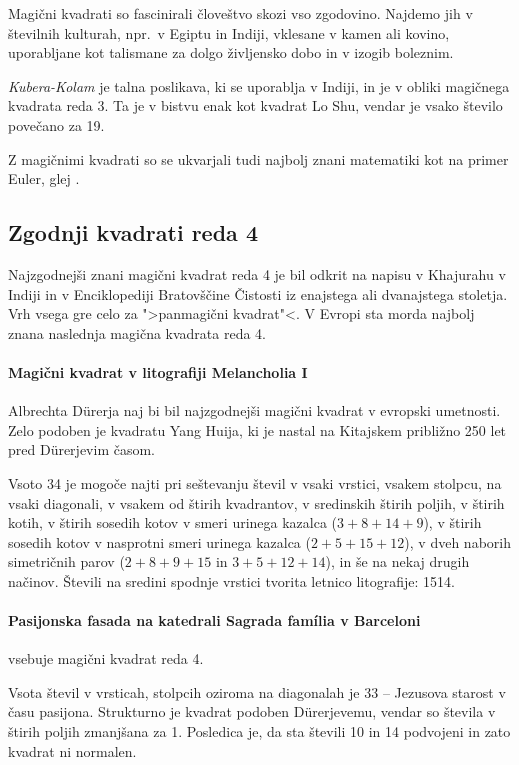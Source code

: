 \documentclass[a4paper,12pt]{article}
\theoremstyle{definition}
\theoremstyle{plain}
\begin{document}
Magični kvadrati so fascinirali človeštvo skozi vso zgodovino. Najdemo jih
v številnih kulturah, npr.\ v Egiptu in Indiji, vklesane v kamen ali
kovino, uporabljane kot talismane za dolgo življensko dobo in v
izogib boleznim.

\emph{Kubera-Kolam} je talna poslikava, ki se uporablja v Indiji, in je v
obliki magičnega kvadrata reda 3. Ta je v bistvu enak kot kvadrat
Lo Shu, vendar je vsako število povečano za 19.

Z magičnimi kvadrati so se ukvarjali tudi najbolj znani matematiki kot na
primer Euler, glej \cite{euler}. %


\subsection{Zgodnji kvadrati reda 4}

Najzgodnejši znani magični kvadrat reda 4 je bil odkrit na napisu
v Khajurahu v Indiji in v Enciklopediji Bratovščine Čistosti iz enajstega
ali dvanajstega stoletja. Vrh vsega gre celo za ">panmagični kvadrat"<.
V Evropi sta morda najbolj znana naslednja magična kvadrata reda 4.

\paragraph{Magični kvadrat v litografiji Melancholia I}
Albrechta Dürerja naj bi bil najzgodnejši magični kvadrat
v evropski umetnosti. Zelo podoben je kvadratu Yang Huija, ki je nastal na Kitajskem
približno 250 let pred Dürerjevim časom.

Vsoto 34 je mogoče najti pri seštevanju števil v vsaki vrstici, vsakem stolpcu,
na vsaki diagonali, v vsakem od štirih kvadrantov, v sredinskih štirih poljih,
v štirih kotih, v štirih sosedih kotov v smeri urinega kazalca (\(3+8+14+9\)), v
štirih sosedih kotov v nasprotni smeri urinega kazalca (\(2+5+15+12\)), v dveh naborih
simetričnih parov (\(2+8+9+15\) in \(3+5+12+14\)), in še na nekaj drugih načinov.
Števili na sredini spodnje vrstici tvorita letnico litografije: 1514.

\paragraph{Pasijonska fasada na katedrali Sagrada família v Barceloni}
vsebuje magični kvadrat reda 4.

Vsota števil v vrsticah, stolpcih oziroma na diagonalah je 33 -- Jezusova starost
v času pasijona. Strukturno je kvadrat podoben Dürerjevemu, vendar so števila
v štirih poljih zmanjšana za 1. Posledica je, da sta števili 10 in 14 podvojeni
in zato kvadrat ni normalen.
\end{document}
